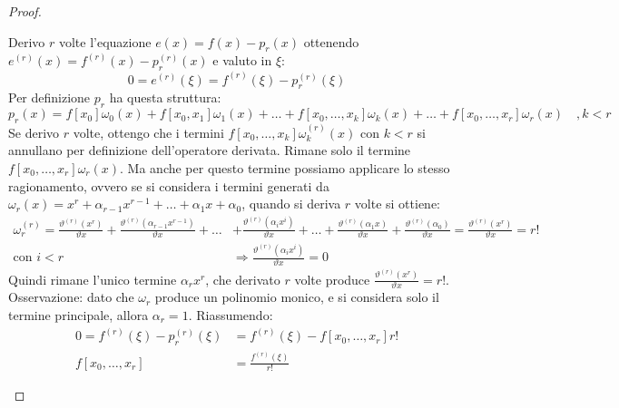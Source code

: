 \begin{proof}
\begin{enumerate}
  Derivo $r$ volte l'equazione $e(x) = f(x) - p_{r}(x)$ ottenendo 
  $e^{(r)}(x) = f^{(r)}(x) -  p_{r}^{(r)}(x)$ e valuto in $\xi$:
  \begin{displaymath}
  	0 = e^{(r)}(\xi) = f^{(r)}(\xi) -  p_{r}^{(r)}(\xi)
  \end{displaymath}
  Per definizione $p_{r}$ ha questa struttura:
  \begin{displaymath}
  	p_{r}(x) = f[x_{0}] \omega_{0}(x) + f[x_{0}, x_{1}] \omega_{1}(x) + \ldots + 
  		f[x_{0}, \ldots, x_{k}]\omega_{k}(x) + \ldots + 
  		f[x_{0}, \ldots, x_{r}]\omega_{r}(x) \quad, k < r
  \end{displaymath}
  Se derivo $r$ volte, ottengo che i termini $f[x_{0}, \ldots,
  x_{k}]\omega_{k}^{(r)}(x)$ con $k < r$ si annullano per definizione
  dell'operatore derivata. Rimane solo il termine $f[x_{0}, \ldots,
  x_{r}]\omega_{r}(x)$. Ma anche per questo termine possiamo applicare lo stesso
  ragionamento, ovvero se si considera i termini generati da 
  $\omega_{r}(x) = x^{r} + \alpha_{r-1}x^{r-1} + \ldots + \alpha_{1}x +
  \alpha_{0}$, quando si deriva $r$ volte si ottiene: 
  \begin{displaymath}
  \begin{split}
  	\omega_{r}^{(r)} = \frac{\vartheta^{(r)}(x^{r})}{\vartheta x} + 
  		\frac{\vartheta^{(r)}(\alpha_{r-1}x^{r-1})}{\vartheta x} + \ldots &+ 
  		\frac{\vartheta^{(r)}(\alpha_{i}x^{i})}{\vartheta x} + \ldots +
  		\frac{\vartheta^{(r)}(\alpha_{1}x)}{\vartheta x} + 
  		\frac{\vartheta^{(r)}(\alpha_{0})}{\vartheta x} = 
  		\frac{\vartheta^{(r)}(x^{r})}{\vartheta x} = r! \\
  	\text{con } i < r &\Rightarrow
  	\frac{\vartheta^{(r)}(\alpha_{i}x^{i})}{\vartheta x} = 0
  \end{split}
  \end{displaymath}
  Quindi rimane l'unico termine $\alpha_{r} x^{r}$, che derivato $r$ volte
  produce $\frac{\vartheta^{(r)}(x^{r})}{\vartheta x} = r!$. Osservazione: dato
  che $\omega_{r}$ produce un polinomio monico, e si considera solo il termine
  principale, allora $\alpha_{r} = 1$. Riassumendo:
  \begin{displaymath}
  \begin{split}
  	0 = f^{(r)}(\xi) -  p_{r}^{(r)}(\xi) &= f^{(r)}(\xi) - 
  	f[x_{0}, \ldots, x_{r}] r! \\
  	f[x_{0}, \ldots, x_{r}] &= \frac{f^{(r)}(\xi)}{r!}
  \end{split}
  \end{displaymath}
  

\end{enumerate}
\end{proof}
